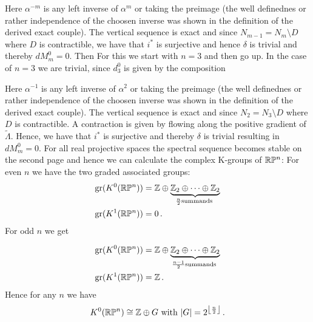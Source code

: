 \begin{example}
	 \begin{center}
	 \end{center}
	 Here $\alpha^{-m}$ is any left inverse of $\alpha^m$ or taking the preimage (the well definednes or rather independence of the choosen inverse was shown in the definition of the derived exact couple). The vertical sequence is exact and since $N_{m-1}=N_m\setminus D$ where $D$ is contractible, we have that $i^*$ is surjective and hence $\delta$ is trivial and thereby $dM_m^0=0$.
	  Then For this we start with $n=3$ and then go up. In the case of $n=3$ we are trivial, since $d^0_3$ is given by the composition
	\begin{center}
	\end{center}

			Here $\alpha^{-1}$ is any left inverse of $\alpha^2$ or taking the preimage (the well definednes or rather independence of the choosen inverse was shown in the definition of the derived exact couple). The vertical sequence is exact and since $N_2=N_3\setminus D$ where $D$ is contractible. A contraction is given by flowing along the positive gradient of $\tilde{\Lambda}$. Hence, we have that $i^*$ is surjective and thereby $\delta$ is trivial resulting in $dM_m^0=0$. For all real projective spaces the spectral sequence becomes stable on the second page and hence we can calculate the complex K-groups of $\mathbb{R}\mathbb{P}^n$: 
			For even $n$ we have the two graded associated groups:
			\begin{align*}
				\operatorname{\mathrm{gr}}(K^0(\mathbb{R}\mathbb{P}^n))&=\mathbb{Z}\oplus \underbrace{\mathbb{Z}_2 \oplus \cdots \oplus \mathbb{Z}_2}_{\frac{n}{2} \text{summands }} \\
				\operatorname{\mathrm{gr}}(K^1(\mathbb{R}\mathbb{P}^n))&=0\,.
			\end{align*}
			For odd $n$ we get
			
						\begin{align*}
				\operatorname{\mathrm{gr}}(K^0(\mathbb{R}\mathbb{P}^n))&=\mathbb{Z}\oplus \underbrace{\mathbb{Z}_2 \oplus \cdots \oplus \mathbb{Z}_2}_{\frac{n-1}{2} \text{summands }} \\
				\operatorname{\mathrm{gr}}(K^1(\mathbb{R}\mathbb{P}^n))&=\mathbb{Z}\,.
			\end{align*}
			Hence for any $n$ we have \begin{equation*}
				K^0(\mathbb{R}\mathbb{P}^n)\cong \mathbb{Z}\oplus G \text{ with } |G|=2^{\left\lfloor \frac{n}{2}\right\rfloor}\,.
			\end{equation*}
			

\end{example}
